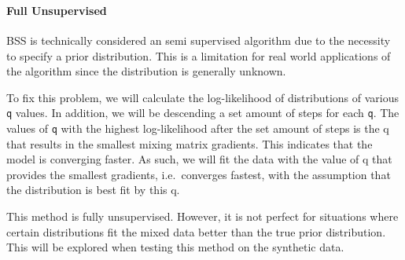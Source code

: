 \documentclass[11pt]{article}
\begin{document}
    \begin{center}
    \end{center}
    { \hspace*{\fill} \\}
    
    \begin{center}
    \end{center}
    { \hspace*{\fill} \\}
    
    \hypertarget{full-unsupervised}{%
\paragraph{Full Unsupervised}\label{full-unsupervised}}

BSS is technically considered an semi supervised algorithm due to the
necessity to specify a prior distribution. This is a limitation for real
world applications of the algorithm since the distribution is generally
unknown.

To fix this problem, we will calculate the log-likelihood of
distributions of various \texttt{q} values. In addition, we will be
descending a set amount of steps for each \texttt{q}. The values of
\texttt{q} with the highest log-likelihood after the set amount of steps
is the q that results in the smallest mixing matrix gradients. This
indicates that the model is converging faster. As such, we will fit the
data with the value of q that provides the smallest gradients,
i.e.~converges fastest, with the assumption that the distribution is
best fit by this q.

This method is fully unsupervised. However, it is not perfect for
situations where certain distributions fit the mixed data better than
the true prior distribution. This will be explored when testing this
method on the synthetic data.
\end{document}
